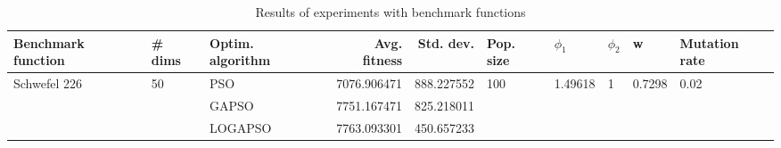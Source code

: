 \begin{table}
\centering
\caption{Results of experiments with benchmark functions}
\begin{tabular}{lllrrlllll}
\toprule
           Benchmark function &             \# dims & Optim. algorithm &  Avg. fitness &  Std. dev. &            Pop. size &               $\phi_{1}$ &         $\phi_{2}$ &                       w &         Mutation rate \\
\midrule
\multirow{3}{*}{Schwefel 226} & \multirow{3}{*}{50} &              PSO &   7076.906471 & 888.227552 & \multirow{3}{*}{100} & \multirow{3}{*}{1.49618} & \multirow{3}{*}{1} & \multirow{3}{*}{0.7298} & \multirow{3}{*}{0.02} \\
                              &                     &            GAPSO &   7751.167471 & 825.218011 &                      &                          &                    &                         &                       \\
                              &                     &          LOGAPSO &   7763.093301 & 450.657233 &                      &                          &                    &                         &                       \\
\bottomrule
\end{tabular}
\end{table}
